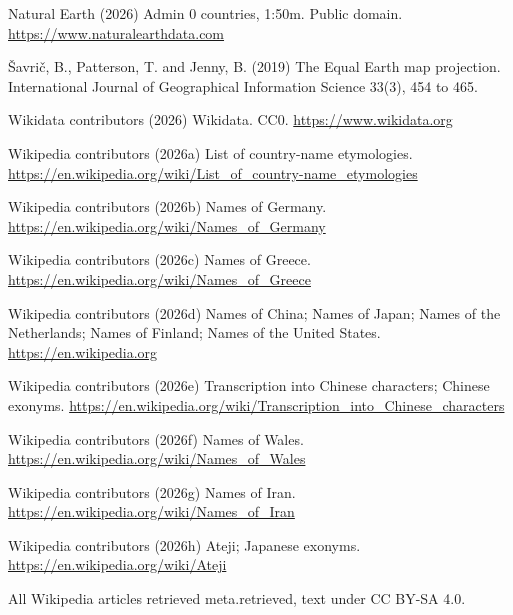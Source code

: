 \documentclass[11pt,a4paper]{article}
\begin{document}
Natural Earth (2026) Admin 0 countries, 1:50m. Public domain. \url{https://www.naturalearthdata.com}

Šavrič, B., Patterson, T. and Jenny, B. (2019) The Equal Earth map projection. International Journal of Geographical Information Science 33(3), 454 to 465.

Wikidata contributors (2026) Wikidata. CC0. \url{https://www.wikidata.org}

Wikipedia contributors (2026a) List of country-name etymologies. \url{https://en.wikipedia.org/wiki/List_of_country-name_etymologies}

Wikipedia contributors (2026b) Names of Germany. \url{https://en.wikipedia.org/wiki/Names_of_Germany}

Wikipedia contributors (2026c) Names of Greece. \url{https://en.wikipedia.org/wiki/Names_of_Greece}

Wikipedia contributors (2026d) Names of China; Names of Japan; Names of the Netherlands; Names of Finland; Names of the United States. \url{https://en.wikipedia.org}

Wikipedia contributors (2026e) Transcription into Chinese characters; Chinese exonyms. \url{https://en.wikipedia.org/wiki/Transcription_into_Chinese_characters}

Wikipedia contributors (2026f) Names of Wales. \url{https://en.wikipedia.org/wiki/Names_of_Wales}

Wikipedia contributors (2026g) Names of Iran. \url{https://en.wikipedia.org/wiki/Names_of_Iran}

Wikipedia contributors (2026h) Ateji; Japanese exonyms. \url{https://en.wikipedia.org/wiki/Ateji}

All Wikipedia articles retrieved {{meta.retrieved}}, text under CC BY-SA 4.0.
\end{document}
